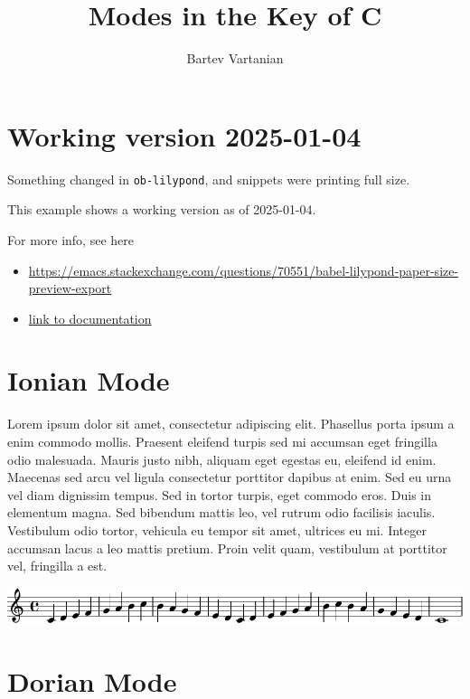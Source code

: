\documentclass[11pt]{article}
\author{Bartev Vartanian}
\date{}
\title{Modes in the Key of C}
\begin{document}
\maketitle

\section*{Working version 2025-01-04}
\label{sec:org0eb20d9}

Something changed in \texttt{ob-lilypond}, and snippets were printing full size.

This example shows a working version as of 2025-01-04.

For more info, see here
\begin{itemize}
\item \url{https://emacs.stackexchange.com/questions/70551/babel-lilypond-paper-size-preview-export}
\item \href{https://lilypond.org/doc/v2.24/Documentation/usage/other-programs}{link to documentation}
\end{itemize}

\section*{Ionian Mode}
\label{sec:org3a60bd3}

Lorem ipsum dolor sit amet, consectetur adipiscing elit. Phasellus
porta ipsum a enim commodo mollis. Praesent eleifend turpis sed mi
accumsan eget fringilla odio malesuada. Mauris justo nibh, aliquam
eget egestas eu, eleifend id enim. Maecenas sed arcu vel ligula
consectetur porttitor dapibus at enim. Sed eu urna vel diam dignissim
tempus. Sed in tortor turpis, eget commodo eros. Duis in elementum
magna. Sed bibendum mattis leo, vel rutrum odio facilisis iaculis.
Vestibulum odio tortor, vehicula eu tempor sit amet, ultrices eu mi.
Integer accumsan lacus a leo mattis pretium. Proin velit quam,
vestibulum at porttitor vel, fringilla a est.

\begin{center}
\includegraphics[width=.9\linewidth]{ionian.pdf}
\end{center}

\section*{Dorian Mode}
\label{sec:org5276608}
\end{document}
